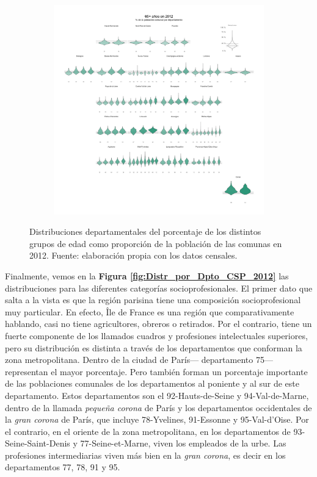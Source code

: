 \begin{figure}[h]
\begin{subfigure}{0.3\textwidth}
	\end{subfigure}
	~
	\begin{subfigure}{0.3\textwidth}
	\includegraphics[width = \textwidth]{Figs/AED/Geofacet_Distr_por_Dpto_Ed6_2012}
	\end{subfigure}
	\caption{Distribuciones departamentales del porcentaje de los distintos grupos de edad como proporción de la población de las comunas en 2012. Fuente: elaboración propia con los datos censales.}
	\label{fig:Distr_por_Dpto_Edades_2012}	
\end{figure}

Finalmente, vemos en la \textbf{Figura \ref{fig:Distr_por_Dpto_CSP_2012}} las distribuciones para las diferentes categorías socioprofesionales. El primer dato que salta a la vista es que la región parisina tiene una composición socioprofesional muy particular. En efecto, Île de France es una región que comparativamente hablando, casi no tiene agricultores, obreros o retirados. Por el contrario, tiene un fuerte componente de los llamados cuadros y profesiones intelectuales superiores, pero su distribución es distinta a través de los departamentos que conforman la zona metropolitana. Dentro de la ciudad de París--- departamento 75--- representan el mayor porcentaje. Pero también forman un porcentaje importante de las poblaciones comunales de los departamentos al poniente y al sur de este departamento.  Estos departamentos son el 92-Hauts-de-Seine y 94-Val-de-Marne, dentro de la llamada \textit{pequeña corona} de París y los departamentos occidentales de la \textit{gran corona} de París, que incluye 78-Yvelines, 91-Essonne y 95-Val-d'Oise. Por el contrario, en el oriente de la zona metropolitana, en los departamentos de 93-Seine-Saint-Denis y 77-Seine-et-Marne, viven los empleados de la urbe. Las profesiones intermediarias viven más bien en la \textit{gran corona}, es decir en los departamentos 77, 78, 91 y 95.\\
 
